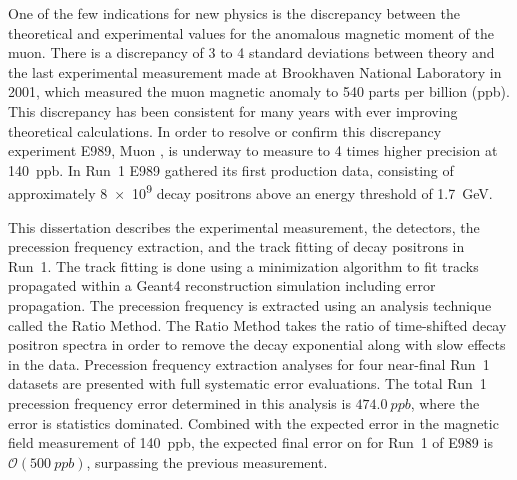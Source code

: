 


One of the few indications for new physics is the discrepancy between the theoretical and experimental values for the anomalous magnetic moment of the muon. There is a discrepancy of 3 to 4 standard deviations between theory and the last experimental measurement made at Brookhaven National Laboratory in 2001, which measured the muon magnetic anomaly \amu to 540 parts per billion (ppb). This discrepancy has been consistent for many years with ever improving theoretical calculations. In order to resolve or confirm this discrepancy experiment E989, Muon \gmtwo, is underway to measure \amu to 4 times higher precision at \SI{140}{ppb}. In Run~1 E989 gathered its first production data, consisting of approximately \SI{8e9}{} decay positrons above an energy threshold of \SI{1.7}{\GeV}.

This dissertation describes the experimental measurement, the detectors, the precession frequency extraction, and the track fitting of decay positrons in Run~1. The track fitting is done using a \chisq minimization algorithm to fit tracks propagated within a Geant4 reconstruction simulation including error propagation. The precession frequency is extracted using an analysis technique called the Ratio Method. The Ratio Method takes the ratio of time-shifted decay positron spectra in order to remove the decay exponential along with slow effects in the data. Precession frequency extraction analyses for four near-final Run~1 datasets are presented with full systematic error evaluations. The total Run~1 precession frequency error determined in this analysis is $\SI{474.0}{ppb}$, where the error is statistics dominated. Combined with the expected error in the magnetic field measurement of \SI{140}{ppb}, the expected final error on \amu for Run~1 of E989 is $\mathcal{O}(\SI{500}{ppb})$, surpassing the previous measurement.






